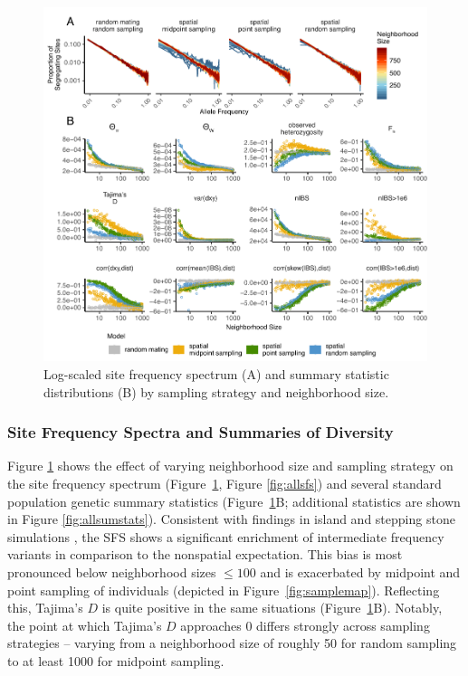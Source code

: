 \documentclass[10pt,twoside,lineno,hidelinks]{preprint}
\begin{document}
\begin{figure}[p]
\centering
\includegraphics[width=\textwidth]{figures/sfs_w_sumstats_loglog.pdf}
\caption{Log-scaled site frequency spectrum (A) and summary statistic distributions (B) by sampling strategy and neighborhood size.}
\label{fig:sumstats}
\end{figure}


\subsubsection{Site Frequency Spectra and Summaries of Diversity}

Figure \ref{fig:sumstats} shows the effect of varying neighborhood size and sampling strategy on the site frequency spectrum (Figure~\ref{fig:sumstats}, Figure \ref{fig:allsfs}) and several standard population genetic summary statistics (Figure~\ref{fig:sumstats}B; additional statistics are shown in Figure \ref{fig:allsumstats}). Consistent with findings in island and stepping stone simulations \citep{Stadler2009}, the SFS shows a significant enrichment of intermediate frequency variants in comparison to the nonspatial expectation. This bias is most pronounced below neighborhood sizes $\leq 100$ and is exacerbated by midpoint and point sampling of individuals (depicted in Figure~\ref{fig:samplemap}). 
Reflecting this, Tajima's $D$ is quite positive in the same situations (Figure~\ref{fig:sumstats}B). Notably, the point at which Tajima's $D$ approaches 0 differs strongly across sampling strategies -- varying from a neighborhood size of roughly 50 for random sampling to at least 1000 for midpoint sampling. 
\end{document}
